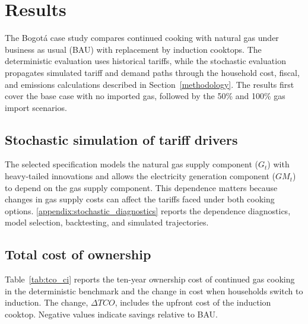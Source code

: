 \documentclass[authoryear,preprint,review,10pt]{elsarticle}
\begin{document}
\section{Results}
\label{results}

The Bogotá case study compares continued cooking with natural gas under business as usual (BAU) with replacement by induction cooktops. The deterministic evaluation uses historical tariffs, while the stochastic evaluation propagates simulated tariff and demand paths through the household cost, fiscal, and emissions calculations described in Section~\ref{methodology}. The results first cover the base case with no imported gas, followed by the 50\% and 100\% gas import scenarios.

\subsection{Stochastic simulation of tariff drivers}
\label{results:simulation}

The selected specification models the natural gas supply component ($G_t$) with heavy-tailed innovations and allows the electricity generation component ($GM_t$) to depend on the gas supply component. This dependence matters because changes in gas supply costs can affect the tariffs faced under both cooking options. \ref{appendix:stochastic_diagnostics} reports the dependence diagnostics, model selection, backtesting, and simulated trajectories.

\subsection{Total cost of ownership}
\label{results:tco}

Table~\ref{tab:tco_ci} reports the ten-year ownership cost of continued gas cooking in the deterministic benchmark and the change in cost when households switch to induction. The change, $\Delta TCO$, includes the upfront cost of the induction cooktop. Negative values indicate savings relative to BAU.
\end{document}
